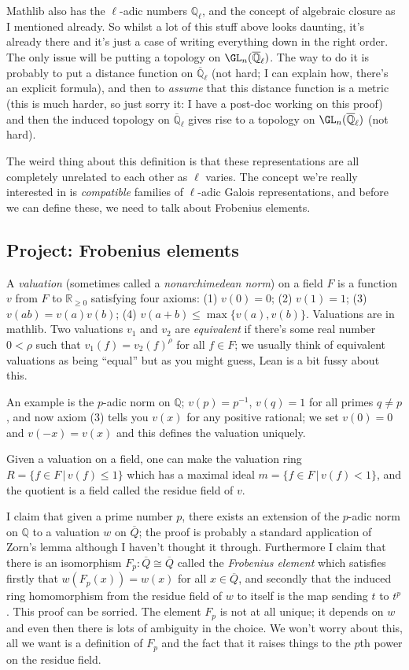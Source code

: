 \documentclass{amsart}
\newcommand{\Q}{\mathbb{Q}}
\newcommand{\R}{\mathbb{R}}
\begin{document}
Mathlib also has the $\ell$-adic numbers $\Q_\ell$, and the concept of algebraic closure as I mentioned already. So whilst a lot of this stuff above looks daunting, it's already there and it's just a case of writing everything down in the right order. The only issue will be putting a topology on $\GL_n(\overline{\Q}_\ell)$. The way to do it is probably to put a distance function on $\overline{\Q}_\ell$ (not hard; I can explain how, there's an explicit formula), and then to \emph{assume} that this distance function is a metric (this is much harder, so just sorry it: I have a post-doc working on this proof) and then the induced topology on $\overline{\Q}_\ell$ gives rise to a topology on $\GL_n(\overline{\Q}_\ell)$ (not hard). 

The weird thing about this definition is that these representations are all completely unrelated to each other as $\ell$ varies. The concept we're really interested in is \emph{compatible} families of $\ell$-adic Galois representations, and before we can define these, we need to talk about Frobenius elements.

\subsection{Project: Frobenius elements}

A \emph{valuation} (sometimes called a \emph{nonarchimedean norm}) on a field $F$ is a function $v$ from $F$ to $\R_{\geq0}$ satisfying four axioms: (1) $v(0)=0$; (2) $v(1)=1$; (3) $v(ab)=v(a)v(b)$; (4) $v(a+b)\leq \max\{v(a),v(b)\}$. Valuations are in mathlib. Two valuations $v_1$ and $v_2$ are \emph{equivalent} if there's some real number $0<\rho$ such that $v_1(f)=v_2(f)^\rho$ for all $f\in F$; we usually think of equivalent valuations as being ``equal'' but as you might guess, Lean is a bit fussy about this.

An example is the $p$-adic norm on $\Q$; $v(p)=p^{-1}$, $v(q)=1$ for all primes $q\not=p$, and now axiom (3) tells you $v(x)$ for any positive rational; we set $v(0)=0$ and $v(-x)=v(x)$ and this defines the valuation uniquely.

Given a valuation on a field, one can make the valuation ring $R=\{f\in F\,|\,v(f)\leq 1\}$ which has a maximal ideal $m=\{f\in F\,|\,v(f)<1\}$, and the quotient is a field called the residue field of $v$.

I claim that given a prime number $p$, there exists an extension of the $p$-adic norm on $\Q$ to a valuation $w$ on $\overline{Q}$; the proof is probably a standard application of Zorn's lemma although I haven't thought it through. Furthermore I claim that there is an isomorphism $F_p:\overline{Q}\cong\overline{Q}$ called the \emph{Frobenius element} which satisfies firstly that $w(F_p(x))=w(x)$ for all $x\in\overline{Q}$, and secondly that the induced ring homomorphism from the residue field of $w$ to itself is the map sending $t$ to $t^p$. This proof can be sorried. The element $F_p$ is not at all unique; it depends on $w$ and even then there is lots of ambiguity in the choice. We won't worry about this, all we want is a definition of $F_p$ and the fact that it raises things to the $p$th power on the residue field.
\end{document}
